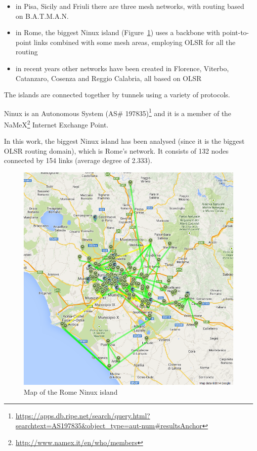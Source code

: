 \documentclass[a4paper,11pt,twoside,openright]{memoir}
\newcommand{\figref}[1] {Figure~\ref{#1}}
\begin{document}
\begin{itemize}
\itemsep1pt\parskip0pt
\item
  in Pisa, Sicily and Friuli there are three mesh networks, with routing
  based on B.A.T.M.A.N.
\item
  in Rome, the biggest Ninux island (\figref{fig:ninux_map})
  uses a backbone with point-to-point
  links combined with some mesh areas, employing OLSR for all the
  routing
\item
  in recent years other networks have been created in Florence, Viterbo,
  Catanzaro, Cosenza and Reggio Calabria, all based on OLSR
\end{itemize}

The islands are connected together by tunnels using a variety of
protocols.

Ninux is an Autonomous System (AS\# 197835)\footnote{\url{https://apps.db.ripe.net/search/query.html?searchtext=AS197835\&object_type=aut-num\#resultsAnchor}}
and it is a member of the NaMeX\footnote{\url{http://www.namex.it/en/who/members}}
Internet Exchange Point.

In this work, the biggest Ninux island has been analysed (since it is
the biggest OLSR routing domain), which is Rome's network. It consists
of 132 nodes connected by 154 links (average degree of 2.333).

\begin{figure}[htbp]
\centering
\includegraphics{images/ninux_map.png}
\caption{Map of the Rome Ninux island}
\label{fig:ninux_map}
\end{figure}
\end{document}
